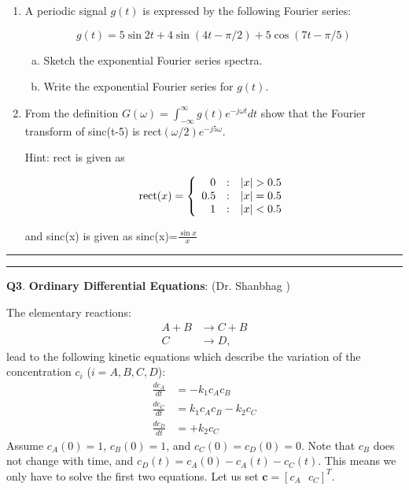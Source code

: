 \documentclass[11pt,letterpaper]{article}
\newcommand{\highlight}[1]{\textcolor{BrickRed}{#1}}
\begin{document}
\begin{enumerate}
\item A periodic signal $g(t)$ is expressed by the following Fourier series:

\begin{equation}
g(t)= 5\sin 2t + 4 \sin(4t-\pi/2) + 5\cos(7t - \pi/5)
\end{equation}

\begin{enumerate}[a)]

\item Sketch the exponential Fourier
 series spectra.

\item Write the exponential Fourier series for $g(t)$.


\end{enumerate}

\item From the definition $G(\omega)=\int_{-\infty}^{\infty}
g(t) e^{-j\omega t}dt $ show that the Fourier transform of
sinc(t-5) is rect$(\omega/2)e^{-j5\omega}$.


\vspace*{0.5cm}

Hint: $\mbox{rect}$ is given as

\begin{equation}
\text{rect}(x) = \left\{\begin{array}{r@{\quad:\quad}l}
 0 & |x|>0.5 \\ 0.5
& |x|=0.5 \\ 1  & |x|<0.5
\end{array} \right.
\end{equation}

\noindent and sinc(x) is given as sinc(x)=$\frac{\sin{x}}{x}$

\end{enumerate}

\bigskip
\hrule \medskip

\pagebreak

\pagebreak
\hrule 
\medskip
\textbf{Q3}. \highlight{\textbf{Ordinary Differential Equations}}: (Dr. Shanbhag )
\label{q3}
\bigskip

The elementary reactions:
%
\begin{align*}
A + B & \rightarrow C + B \\
C & \rightarrow D,
\end{align*}
%
lead to the following kinetic equations which describe the variation of the concentration $c_i$ ($i = A, B, C, D$):
%
\begin{align*}
\frac{dc_A}{dt} & = -k_1 c_A c_B \\
\frac{dc_C}{dt} & = k_1 c_A c_B - k_2 c_C\\
\frac{dc_D}{dt} & = +k_2 c_C
\end{align*}
% 
Assume $c_A(0) = 1$, $c_B(0) = 1$, and $c_C(0)=c_D(0)=0$. Note that $c_B$ does not change with time, and $c_D(t) = c_A(0) - c_A(t) - c_C(t)$. This means we only have to solve the first two equations. Let us set $\mathbf{c} = [c_A~~~c_C]^T$.
\end{document}
